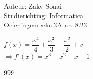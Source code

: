 \documentclass[a4paper]{article}
\begin{document}
  
\noindent \large Auteur: Zaky Souai \\
\noindent \large Studierichting:  Informatica\\
\noindent \large Oefeningenreeks 3A nr. 8.23\\

\bigskip

\normalsize

$f(x) = \dfrac{x^4}{4} + \dfrac{x^3}{3} - \dfrac{x^2}{2} + x$ \\

$\Rightarrow f'(x) = x^3 + x^2 - x + 1$


\begin{thebibliography}{999}
\end{thebibliography}
\end{document}
